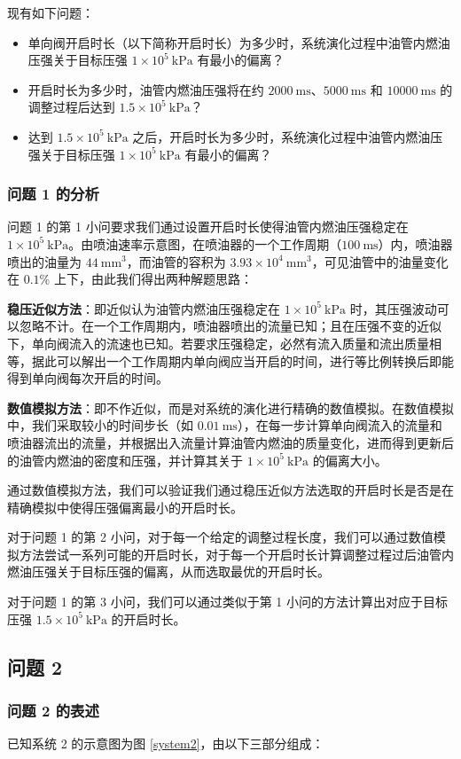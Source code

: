 \documentclass[withoutpreface,bwprint]{cumcmthesis}
\newcommand{\prb}{\times 10^5~\mathrm{kPa}}
\newcommand{\vol}{~\mathrm{mm^3}}
\newcommand{\tim}{~\mathrm{ms}}
\begin{document}
现有如下问题：

\begin{itemize}
	\item 单向阀开启时长（以下简称开启时长）为多少时，系统演化过程中油管内燃油压强关于目标压强 $1\prb$ 有最小的偏离？
	\item 开启时长为多少时，油管内燃油压强将在约 $2000\tim$、$5000\tim$ 和 $10000\tim$ 的调整过程后达到 $1.5\prb$？
	\item 达到 $1.5\prb$ 之后，开启时长为多少时，系统演化过程中油管内燃油压强关于目标压强 $1\prb$ 有最小的偏离？
\end{itemize}

\subsubsection{问题 1 的分析}
问题 1 的第 1 小问要求我们通过设置开启时长使得油管内燃油压强稳定在 $1\prb$。由喷油速率示意图，在喷油器的一个工作周期（$100\tim$）内，喷油器喷出的油量为 $44\vol$，而油管的容积为 $3.93\times 10^4\vol$，可见油管中的油量变化在 $0.1\%$ 上下，由此我们得出两种解题思路：

\textbf{稳压近似方法}：即近似认为油管内燃油压强稳定在 $1\prb$ 时，其压强波动可以忽略不计。在一个工作周期内，喷油器喷出的流量已知；且在压强不变的近似下，单向阀流入的流速也已知。若要求压强稳定，必然有流入质量和流出质量相等，据此可以解出一个工作周期内单向阀应当开启的时间，进行等比例转换后即能得到单向阀每次开启的时间。

\textbf{数值模拟方法}：即不作近似，而是对系统的演化进行精确的数值模拟。在数值模拟中，我们采取较小的时间步长（如 $0.01\tim$），在每一步计算单向阀流入的流量和喷油器流出的流量，并根据出入流量计算油管内燃油的质量变化，进而得到更新后的油管内燃油的密度和压强，并计算其关于 $1\prb$ 的偏离大小。

通过数值模拟方法，我们可以验证我们通过稳压近似方法选取的开启时长是否是在精确模拟中使得压强偏离最小的开启时长。

对于问题 1 的第 2 小问，对于每一个给定的调整过程长度，我们可以通过数值模拟方法尝试一系列可能的开启时长，对于每一个开启时长计算调整过程过后油管内燃油压强关于目标压强的偏离，从而选取最优的开启时长。

对于问题 1 的第 3 小问，我们可以通过类似于第 1 小问的方法计算出对应于目标压强 $1.5\prb$ 的开启时长。
\subsection{问题 2}
\subsubsection{问题 2 的表述}
已知系统 2 的示意图为图 \ref{system2}，由以下三部分组成：
\end{document}

